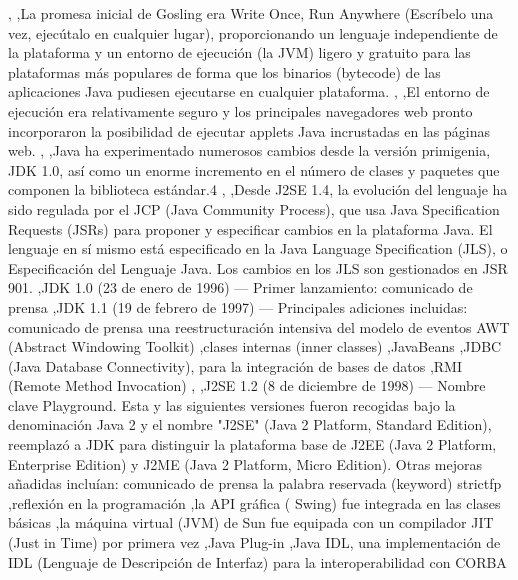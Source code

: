 \documentclass[11pt,a4paper]{book}
\begin{document}
	\bigskip
							,
	\bigskip
							,La promesa inicial de Gosling era Write Once, Run Anywhere (Escríbelo una vez, ejecútalo en cualquier lugar), proporcionando un lenguaje independiente de la plataforma y un entorno de ejecución (la JVM) ligero y gratuito para las plataformas más populares de forma que los binarios (bytecode) de las aplicaciones Java pudiesen ejecutarse en cualquier plataforma.
	\bigskip
							,
	\bigskip
							,El entorno de ejecución era relativamente seguro y los principales navegadores web pronto incorporaron la posibilidad de ejecutar applets Java incrustadas en las páginas web.
	\bigskip
							,
	\bigskip
							,Java ha experimentado numerosos cambios desde la versión primigenia, JDK 1.0, así como un enorme incremento en el número de clases y paquetes que componen la biblioteca estándar.4
	\bigskip
							,
	\bigskip
							,Desde J2SE 1.4, la evolución del lenguaje ha sido regulada por el JCP (Java Community Process), que usa Java Specification Requests (JSRs) para proponer y especificar cambios en la plataforma Java. El lenguaje en sí mismo está especificado en la Java Language Specification (JLS), o Especificación del Lenguaje Java. Los cambios en los JLS son gestionados en JSR 901.
	\bigskip
							,JDK 1.0 (23 de enero de 1996) — Primer lanzamiento: comunicado de prensa
	\bigskip
							,JDK 1.1 (19 de febrero de 1997) — Principales adiciones incluidas: comunicado de prensa una reestructuración intensiva del modelo de eventos AWT (Abstract Windowing Toolkit)
	\bigskip
							,clases internas (inner classes)
	\bigskip
							,JavaBeans
	\bigskip
							,JDBC (Java Database Connectivity), para la integración de bases de datos
	\bigskip
							,RMI (Remote Method Invocation)
	\bigskip
							,
	\bigskip
							,J2SE 1.2 (8 de diciembre de 1998) — Nombre clave Playground. Esta y las siguientes versiones fueron recogidas bajo la denominación Java 2 y el nombre "J2SE" (Java 2 Platform, Standard Edition), reemplazó a JDK para distinguir la plataforma base de J2EE (Java 2 Platform, Enterprise Edition) y J2ME (Java 2 Platform, Micro Edition). Otras mejoras añadidas incluían: comunicado de prensa la palabra reservada (keyword) strictfp
	\bigskip
							,reflexión en la programación
	\bigskip
							,la API gráfica ( Swing) fue integrada en las clases básicas
	\bigskip
							,la máquina virtual (JVM) de Sun fue equipada con un compilador JIT (Just in Time) por primera vez
	\bigskip
							,Java Plug-in
	\bigskip
							,Java IDL, una implementación de IDL (Lenguaje de Descripción de Interfaz) para la interoperabilidad con CORBA
	\bigskip
\end{document}
